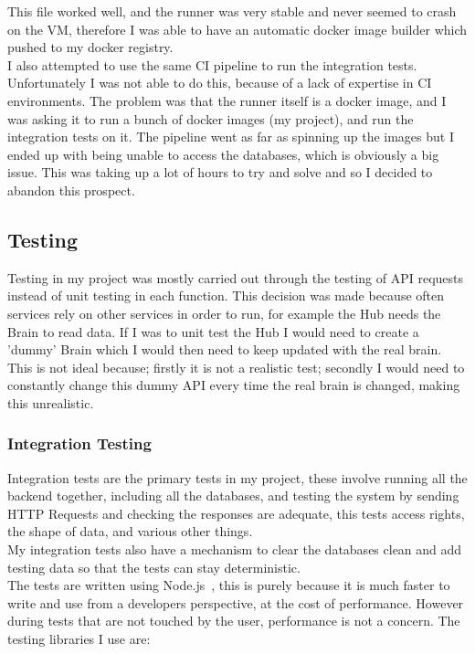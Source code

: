 \documentclass[titlepage]{article}
\begin{document}
This file worked well, and the runner was very stable and never seemed to crash on the VM, therefore I was able to have an automatic docker image builder which pushed to my docker registry. \\

I also attempted to use the same CI pipeline to run the integration tests. Unfortunately I was not able to do this, because of a lack of expertise in CI environments. The problem was that the runner itself is a docker image, and I was asking it to run a bunch of docker images (my project), and run the integration tests on it. The pipeline went as far as spinning up the images but I ended up with being unable to access the databases, which is obviously a big issue. This was taking up a lot of hours to try and solve and so I decided to abandon this prospect. 

\pagebreak
\subsection{Testing}
Testing in my project was mostly carried out through the testing of API requests instead of unit testing in each function. This decision was made because often services rely on other services in order to run, for example the Hub needs the Brain to read data. If I was to unit test the Hub I would need to create a 'dummy' Brain which I would then need to keep updated with the real brain. This is not ideal because; firstly it is not a realistic test; secondly I would need to constantly change this dummy API every time the real brain is changed, making this unrealistic. \\

\subsubsection{Integration Testing}
Integration tests are the primary tests in my project, these involve running all the backend together, including all the databases, and testing the system by sending HTTP Requests and checking the responses are adequate, this tests access rights, the shape of data, and various other things. \\ 
My integration tests also have a mechanism to clear the databases clean and add testing data so that the tests can stay deterministic. \\

The tests are written using Node.js~\cite{nodejs}, this is purely because it is much faster to write and use from a developers perspective, at the cost of performance. However during tests that are not touched by the user, performance is not a concern. The testing libraries I use are:
\end{document}
